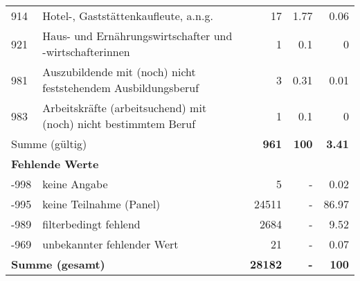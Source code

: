 \begin{longtable}{lXrrr}
        914 & \multicolumn{1}{X}{Hotel-, Gaststättenkaufleute, a.n.g.} & %
          \num{17} &
          \num[round-mode=places,round-precision=2]{1,77} &
          \num[round-mode=places,round-precision=2]{0,06} \\

        921 & \multicolumn{1}{X}{Haus- und Ernährungswirtschafter und -wirtschafterinnen} & %
          \num{1} &
          \num[round-mode=places,round-precision=2]{0,1} &
          \num[round-mode=places,round-precision=2]{0} \\

        981 & \multicolumn{1}{X}{Auszubildende mit (noch) nicht feststehendem Ausbildungsberuf} & %
          \num{3} &
          \num[round-mode=places,round-precision=2]{0,31} &
          \num[round-mode=places,round-precision=2]{0,01} \\

        983 & \multicolumn{1}{X}{Arbeitskräfte (arbeitsuchend) mit (noch) nicht bestimmtem Beruf} & %
          \num{1} &
          \num[round-mode=places,round-precision=2]{0,1} &
          \num[round-mode=places,round-precision=2]{0} \\

     \midrule
     \multicolumn{2}{l}{Summe (gültig)} &
       \textbf{\num{961}} &
     \textbf{100} &
       \textbf{\num[round-mode=places,round-precision=2]{3,41}} \\
     \multicolumn{5}{l}{\textbf{Fehlende Werte}}\\
       -998 &
       keine Angabe &
         \num{5} &
        - &
         \num[round-mode=places,round-precision=2]{0,02} \\
       -995 &
       keine Teilnahme (Panel) &
         \num{24511} &
        - &
         \num[round-mode=places,round-precision=2]{86,97} \\
       -989 &
       filterbedingt fehlend &
         \num{2684} &
        - &
         \num[round-mode=places,round-precision=2]{9,52} \\
       -969 &
       unbekannter fehlender Wert &
         \num{21} &
        - &
         \num[round-mode=places,round-precision=2]{0,07} \\
     \midrule
     \multicolumn{2}{l}{\textbf{Summe (gesamt)}} &
          \textbf{\num{28182}} &
        \textbf{-} &
        \textbf{100} \\
     \bottomrule
     \end{longtable}
     
